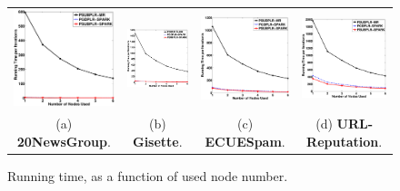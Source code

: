 \documentclass[10pt, conference, compsocconf]{IEEEtran}
\begin{document}
\begin{figure}[tb]
\begin{center}
\begin{tabular}{cccc}
   \includegraphics[height=4.cm,width=4.5cm]{img/20NewsGroup_time.eps}&
   \hspace{-0.6cm}\includegraphics[height=4.cm,width=4.5cm]{img/Gisette_time.eps}&
   \hspace{-0.6cm}\includegraphics[height=4.cm,width=4.5cm]{img/ECUESpam_time.eps}&
   \hspace{-0.6cm}\includegraphics[height=4.cm,width=4.5cm]{img/URL-Reputation_time.eps}\\
   (a) \textbf{20NewsGroup}. & \hspace{-0.3cm}(b) \textbf{Gisette}. & \hspace{-0.3cm}(c) \textbf{ECUESpam}. & \hspace{-0.3cm}(d) \textbf{URL-Reputation}.\\
   \end{tabular}
\end{center}\vspace{-0.3cm}
   \caption{Running time, as a function of used node number.}\vspace{-0.5cm}
\label{fig:time}
\end{figure}
\end{document}
